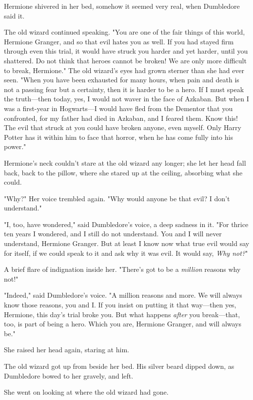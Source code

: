 Hermione shivered in her bed, somehow it seemed very real, when Dumbledore said
it.

The old wizard continued speaking. "You are one of the fair things of this
world, Hermione Granger, and so that evil hates you as well. If you had stayed
firm through even this trial, it would have struck you harder and yet harder,
until you shattered. Do not think that heroes cannot be broken! We are only
more difficult to break, Hermione." The old wizard's eyes had grown sterner
than she had ever seen. "When you have been exhausted for many hours, when pain
and death is not a passing fear but a certainty, then it is harder to be a
hero. If I must speak the truth---then today, yes, I would not waver in the
face of Azkaban. But when I was a first-year in Hogwarts---I would have fled
from the Dementor that you confronted, for my father had died in Azkaban, and I
feared them. Know this! The evil that struck at you could have broken anyone,
even myself. Only Harry Potter has it within him to face that horror, when he
has come fully into his power."

Hermione's neck couldn't stare at the old wizard any longer; she let her head
fall back, back to the pillow, where she stared up at the ceiling, absorbing
what she could.

"Why?" Her voice trembled again. "Why would anyone be that evil? I don't
understand."

"I, too, have wondered," said Dumbledore's voice, a deep sadness in it. "For
thrice ten years I wondered, and I still do not understand. You and I will
never understand, Hermione Granger. But at least I know now what true evil
would say for itself, if we could speak to it and ask why it was evil. It would
say, \emph{Why not?}"

A brief flare of indignation inside her. "There's got to be a \emph{million}
reasons why not!"

"Indeed," said Dumbledore's voice. "A million reasons and more. We will always
know those reasons, you and I. If you insist on putting it that way---then yes,
Hermione, this day's trial broke you. But what happens \emph{after} you
break---that, too, is part of being a hero. Which you are, Hermione Granger,
and will always be."

She raised her head again, staring at him.

The old wizard got up from beside her bed. His silver beard dipped down, as
Dumbledore bowed to her gravely, and left.

She went on looking at where the old wizard had gone.

